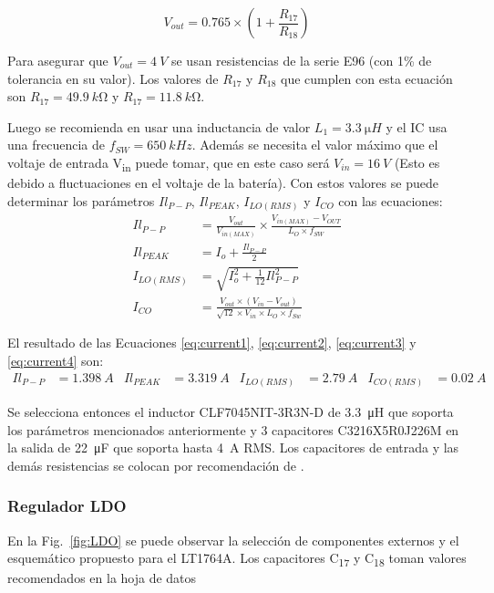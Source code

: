 \begin{equation}
    V_{out}=0.765\times(1+\frac{R_{17}}{R_{18}})
    \label{eq:vout}
\end{equation}

Para asegurar que $V_{out}=\SI{4}{V}$ se usan resistencias de la serie E96 (con 1\% de tolerancia en su valor). Los valores de $R_{17}$ y $R_{18}$ que cumplen con esta ecuación son $R_{17}=\SI{49.9}{k\ohm}$ y $R_{17}=\SI{11.8}{k\ohm}$.

Luego se recomienda en \cite{TPS563210} usar una inductancia de valor $L_1=\SI{3.3}{\micro H}$ y el IC usa una frecuencia de $f_{SW}=\SI{650}{kHz}$. Además se necesita el valor máximo que el voltaje de entrada V\textsubscript{in} puede tomar, que en este caso será $V_{in}=\SI{16}{V}$ (Esto es debido a fluctuaciones en el voltaje de la batería). Con estos valores se puede determinar los parámetros $Il_{P-P}$, $Il_{PEAK}$,  $I_{LO(RMS)}$ y $I_{CO}$ con las ecuaciones:
\begin{align}
Il_{P-P}&=\frac{V_{out}}{V_{in(MAX)}}\times\frac{V_{in(MAX)}-V_{OUT}}{L_O\times f_{SW}} \label{eq:current1}\\
Il_{PEAK}&=I_{o}+\frac{Il_{P-P}}{2} \label{eq:current2}\\
I_{LO(RMS)}&=\sqrt{I_o^2+\frac{1}{12}Il_{P-P}^2} \label{eq:current3} \\
I_{CO}&=\frac{V_{out}\times (V_{in}-V_{out})}{\sqrt{12}\times V_{in}\times L_{O} \times f_{Sw}} \label{eq:current4}
\end{align}

El resultado de las Ecuaciones \ref{eq:current1}, \ref{eq:current2}, \ref{eq:current3} y \ref{eq:current4} son:
\begin{align*}
Il_{P-P}&=\SI{1.398}{A} &
Il_{PEAK}&=\SI{3.319}{A}&
I_{LO(RMS)}&=\SI{2.79}{A} &
I_{CO(RMS)}&=\SI{0.02}{A}
\end{align*}

Se selecciona entonces el inductor CLF7045NIT-3R3N-D de \SI{3.3}{\micro H} que soporta los parámetros mencionados anteriormente \cite{Inductor} y 3 capacitores C3216X5R0J226M en la salida de \SI{22}{\micro F}  que soporta hasta \SI{4}{A} RMS. Los capacitores de entrada y las demás resistencias se colocan por recomendación de \cite{TPS563210}.


\subsubsection{Regulador LDO}

En la Fig.~\ref{fig:LDO} se puede observar la selección de componentes externos y el esquemático propuesto para el LT1764A. Los capacitores C\textsubscript{17} y C\textsubscript{18} toman valores recomendados en la hoja de datos \cite{LT1764A}

